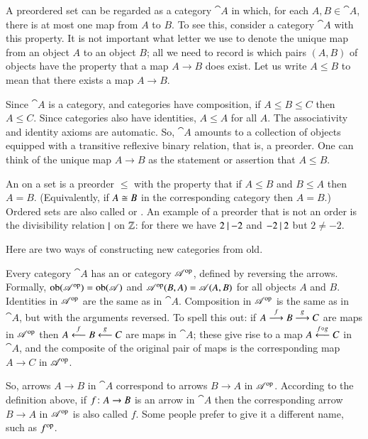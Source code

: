 \begin{examples}
\begin{enumerate}[(b)]
A preordered set can be regarded as a category $\cat{A}$ in which, for each
$A, B \in \cat{A}$, there is at most one map from $A$ to $B$.  To see this,
consider a category $\cat{A}$ with this property.  It is not important what
letter we use to denote the unique map from an object $A$ to an object $B$;
all we need to record is which pairs $(A, B)$ of objects have the property
that a map $A \to B$ does exist.  Let us write $A \leq B$ to mean that
there exists a map $A \to B$.

Since $\cat{A}$ is a category, and categories have composition, if $A \leq
B \leq C$ then $A \leq C$.  Since categories also have identities, $A \leq
A$ for all $A$.  The associativity and identity axioms are automatic.  So,
$\cat{A}$ amounts to a collection of objects equipped with a transitive
reflexive binary relation, that is, a preorder.  One can think of the
unique map $A \to B$ as the statement or assertion that $A \leq B$.

An %
%
%
on a set is a preorder $\leq$ with the property that if $A \leq B$ and $B
\leq A$ then $A = B$.  (Equivalently, if $A \cong B$ in the corresponding
category then $A = B$.)  Ordered sets are also called %
%
%
or .%
%
%
An example of a preorder that is not%
%
%
an order is the divisibility relation $\mathbin{\mid}$ on $\mathbb{Z}$: for there
we have $2 \mathbin{\mid} {-2}$ and $-2 \mathbin{\mid} 2$ but $2 \neq -2$.
\end{enumerate}
\end{examples}

Here are two ways of constructing new categories from old. 

{\sloppy
\begin{constn} 
\label{constn:op-cat}
Every category $\cat{A}$ has an %
%
%
or %
%
%
category $\mathscr{A}^{\mathrm{op}}$,%
%
%
defined by reversing the arrows.  Formally, $\operatorname{ob}(\mathscr{A}^{\mathrm{op}}) =
\operatorname{ob}(\mathscr{A})$ and $\mathscr{A}^{\mathrm{op}}(B, A) = \mathscr{A}(A, B)$ for all objects $A$
and $B$.  Identities in $\mathscr{A}^{\mathrm{op}}$ are the same as in $\cat{A}$.
Composition in $\mathscr{A}^{\mathrm{op}}$ is the same as in $\cat{A}$, but with the
arguments reversed.  To spell this out: if $A \stackrel{f}{\longrightarrow} B \stackrel{g}{\longrightarrow} C$ are
maps in $\mathscr{A}^{\mathrm{op}}$ then $A \stackrel{f}{\longleftarrow} B \stackrel{g}{\longleftarrow} C$ are maps in $\cat{A}$;
these give rise to a map $A \stackrel{f \mathbin{\circ} g}{\longleftarrow} C$ in $\cat{A}$, and the
composite of the original pair of maps is the corresponding map $A \to C$
in $\mathscr{A}^{\mathrm{op}}$.

So, arrows $A \to B$ in $\cat{A}$ correspond to arrows $B \to A$ in
$\mathscr{A}^{\mathrm{op}}$.  According to the definition above, if $f\from A \to B$ is
an arrow in $\cat{A}$ then the corresponding arrow $B \to A$ in
$\mathscr{A}^{\mathrm{op}}$ is also called $f$.  Some people prefer to give it a
different name, such as $f^{\mathrm{op}}$.
\end{constn}
}

